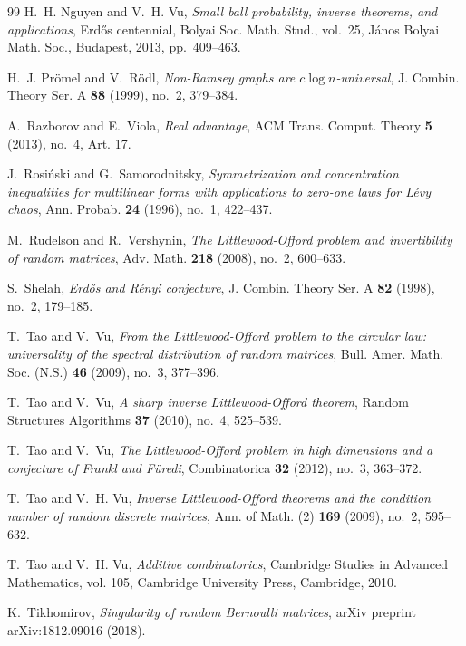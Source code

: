 \documentclass{daj}
\theoremstyle{plain}
\theoremstyle{plain}
\theoremstyle{plain}
\theoremstyle{plain}
\theoremstyle{definition}
\theoremstyle{plain}
\theoremstyle{plain}
\theoremstyle{definition}
\theoremstyle{definition}
\theoremstyle{plain}
\begin{document}
\begin{thebibliography}{99}
H.~H. Nguyen and V.~H. Vu, \emph{Small ball probability, inverse theorems, and
  applications}, Erd{\H{o}}s centennial, Bolyai Soc. Math. Stud., vol.~25,
  J\'{a}nos Bolyai Math. Soc., Budapest, 2013, pp.~409--463.

H.~J. Pr\"omel and V.~R\"odl, \emph{Non-{R}amsey graphs are {$c\log
  n$}-universal}, J. Combin. Theory Ser. A \textbf{88} (1999), no.~2, 379--384.

A.~Razborov and E.~Viola, \emph{Real advantage}, ACM Trans. Comput. Theory
  \textbf{5} (2013), no.~4, Art. 17.

J.~Rosi\'{n}ski and G.~Samorodnitsky, \emph{Symmetrization and concentration
  inequalities for multilinear forms with applications to zero-one laws for
  {L}\'{e}vy chaos}, Ann. Probab. \textbf{24} (1996), no.~1, 422--437.

M.~Rudelson and R.~Vershynin, \emph{The {L}ittlewood-{O}fford problem and
  invertibility of random matrices}, Adv. Math. \textbf{218} (2008), no.~2,
  600--633.

S.~Shelah, \emph{Erd{\H o}s and {R}\'enyi conjecture}, J. Combin. Theory Ser. A
  \textbf{82} (1998), no.~2, 179--185.

T.~Tao and V.~Vu, \emph{From the {L}ittlewood-{O}fford problem to the circular
  law: universality of the spectral distribution of random matrices}, Bull.
  Amer. Math. Soc. (N.S.) \textbf{46} (2009), no.~3, 377--396.

T.~Tao and V.~Vu, \emph{A sharp inverse {L}ittlewood-{O}fford theorem}, Random
  Structures Algorithms \textbf{37} (2010), no.~4, 525--539.

T.~Tao and V.~Vu, \emph{The {L}ittlewood-{O}fford problem in high dimensions
  and a conjecture of {F}rankl and {F}\"{u}redi}, Combinatorica \textbf{32}
  (2012), no.~3, 363--372.

T.~Tao and V.~H. Vu, \emph{Inverse {L}ittlewood-{O}fford theorems and the
  condition number of random discrete matrices}, Ann. of Math. (2) \textbf{169}
  (2009), no.~2, 595--632.

T.~Tao and V.~H. Vu, \emph{Additive combinatorics}, Cambridge Studies in
  Advanced Mathematics, vol. 105, Cambridge University Press, Cambridge, 2010.

K.~Tikhomirov, \emph{Singularity of random {B}ernoulli matrices}, arXiv
  preprint arXiv:1812.09016 (2018).

\end{thebibliography}
\end{document}
